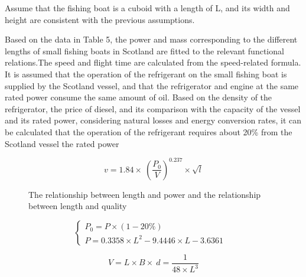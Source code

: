 \documentclass{mcmthesis}
\begin{document}
Assume that the fishing boat is a cuboid with a length of L, and its width and height are consistent with the previous assumptions.

Based on the data in Table 5, the power and mass corresponding to the different lengths of small fishing boats in Scotland are fitted to the relevant functional relations.The speed and flight time are calculated from the speed-related formula.
It is assumed that the operation of the refrigerant on the small fishing boat is supplied by the Scotland vessel, and that the refrigerator and engine at the same rated power consume the same amount of oil. Based on the density of the refrigerator, the price of diesel, and its comparison with the capacity of the vessel and its rated power, considering natural losses and energy conversion rates, it can be calculated that the operation of the refrigerant requires about 20\%  from the Scotland vessel the rated power

\begin{equation}\label{1}
v=1.84\times \ (\frac{P_0}{V}) ^{0.237} \times \sqrt{l}
\end{equation}

\begin{figure}[tbp]
  \caption{The relationship between length and power and the relationship between length and quality }\label{figure1}
\end{figure}

\begin{equation}
\left\{
\begin{array}{lr}
P_0=P \times (1-20\%) &\\
P= 0.3358\times L^2 -9.4446\times L - 3.6361

\end{array}
\right.
\end{equation}



\begin{equation}\label{3}
V=L\times B\times\ d =\frac{1}{48\times L^3}
\end{equation}
\end{document}
